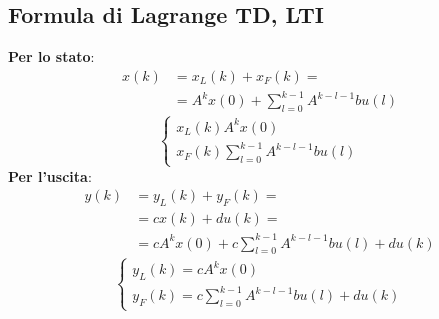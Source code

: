 \begin{landscape}
\begin{multicols*}{3}
    \subsection{Formula di Lagrange TD, LTI}
    \textbf{Per lo stato}:
    \[
            \begin{split}
            x(k) &= x_L(k) + x_F(k) =\\
            &=A^k x(0) + \sum_{l=0}^{k-1}A^{k-l-1}bu(l)
            \end{split}
    \]
    \[
        \begin{cases}
            x_L(k) A^k x(0)\\
            x_F(k) \sum_{l=0}^{k-1}A^{k-l-1}bu(l)
        \end{cases}
    \]
    \textbf{Per l'uscita}:
    \[
        \begin{split}
            y(k) &= y_L(k) + y_F(k) =\\
            &= cx(k)+du(k) = \\
            &=cA^k x(0) + c\sum_{l=0}^{k-1}A^{k-l-1}bu(l) + du(k)
        \end{split}
    \]
    \[
        \begin{cases}
            y_L(k) = cA^k x(0)\\
            y_F(k) = c\sum_{l=0}^{k-1}A^{k-l-1}bu(l) + du(k)
        \end{cases}
    \]

\end{multicols*}
\end{landscape}
